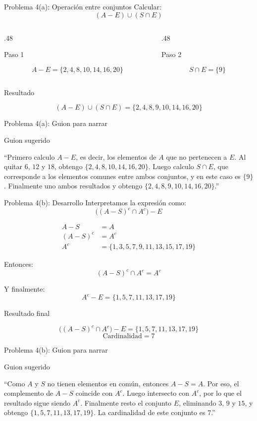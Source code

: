 \documentclass[aspectratio=169,11pt]{beamer}
\newcommand{\BloqueVisual}[2]{
	\begin{block}{#1}
		#2
	\end{block}
}
\newcommand{\BloqueGuion}[1]{
	\begin{exampleblock}{Guion sugerido}
		#1
	\end{exampleblock}
}
\begin{document}
	\begin{frame}{Problema 4(a): Operación entre conjuntos}
		Calcular:
		\[
		(A-E)\cup(S\cap E)
		\]
		
		\begin{columns}[T]
			\begin{column}{.48\textwidth}
				\BloqueVisual{Paso 1}{
					\[
					A-E=\{2,4,8,10,14,16,20\}
					\]
				}
			\end{column}
			\begin{column}{.48\textwidth}
				\BloqueVisual{Paso 2}{
					\[
					S\cap E=\{9\}
					\]
				}
			\end{column}
		\end{columns}
		
		\BloqueVisual{Resultado}{
			\[
			(A-E)\cup(S\cap E)=\{2,4,8,9,10,14,16,20\}
			\]
		}
	\end{frame}
	
	\begin{frame}{Problema 4(a): Guion para narrar}
		\BloqueGuion{
			``Primero calculo \(A-E\), es decir, los elementos de \(A\) que no pertenecen a \(E\). Al quitar \(6\), \(12\) y \(18\), obtengo \(\{2,4,8,10,14,16,20\}\). Luego calculo \(S\cap E\), que corresponde a los elementos comunes entre ambos conjuntos, y en este caso es \(\{9\}\). Finalmente uno ambos resultados y obtengo \(\{2,4,8,9,10,14,16,20\}\).''}
	\end{frame}
	
	\begin{frame}{Problema 4(b): Desarrollo}
		Interpretamos la expresión como:
		\[
		\big((A-S)^c\cap A^c\big)-E
		\]
		
		\begin{align*}
			A-S &= A \\
			(A-S)^c &= A^c \\
			A^c &= \{1,3,5,7,9,11,13,15,17,19\}
		\end{align*}
		
		Entonces:
		\[
		(A-S)^c\cap A^c=A^c
		\]
		
		Y finalmente:
		\[
		A^c-E=\{1,5,7,11,13,17,19\}
		\]
		
		\BloqueVisual{Resultado final}{
			\[
			\big((A-S)^c\cap A^c\big)-E=\{1,5,7,11,13,17,19\}
			\]
			\[
			\text{Cardinalidad}=7
			\]
		}
	\end{frame}
	
	\begin{frame}{Problema 4(b): Guion para narrar}
		\BloqueGuion{
			``Como \(A\) y \(S\) no tienen elementos en común, entonces \(A-S=A\). Por eso, el complemento de \(A-S\) coincide con \(A^c\). Luego intersecto con \(A^c\), por lo que el resultado sigue siendo \(A^c\). Finalmente resto el conjunto \(E\), eliminando \(3\), \(9\) y \(15\), y obtengo \(\{1,5,7,11,13,17,19\}\). La cardinalidad de este conjunto es 7.''}
	\end{frame}
	
\end{document}
